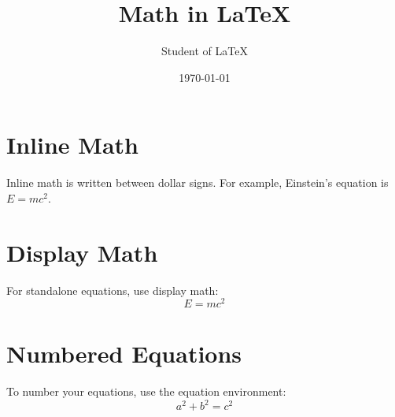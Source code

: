 \documentclass{article}
\title{Math in LaTeX}
\author{Student of LaTeX}
\date{\today}
\begin{document}
\maketitle

\section{Inline Math}
Inline math is written between dollar signs. For example, Einstein's equation is $E = mc^2$.

\section{Display Math}
For standalone equations, use display math:
\[
E = mc^2
\]

\section{Numbered Equations}
To number your equations, use the equation environment:
\begin{equation}
a^2 + b^2 = c^2
\end{equation}
\end{document}
